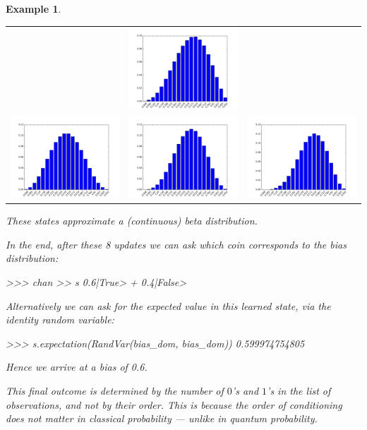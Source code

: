 \documentclass[leqno]{tufte-book} %
\newtheorem{example}[theorem]{Example}
\begin{document}
\begin{example}
\begin{center}
\begin{tabular}{ccc}
&
\includegraphics[width=15em]{Pictures/disc_coin_parameter-5.png}
\\
\includegraphics[width=15em]{Pictures/disc_coin_parameter-6.png} 
&
\includegraphics[width=15em]{Pictures/disc_coin_parameter-7.png}
&
\includegraphics[width=15em]{Pictures/disc_coin_parameter-8.png}
\end{tabular}
\end{center}

\noindent These states approximate a (continuous) beta distribution.

In the end, after these 8 updates we can ask which coin corresponds to
the bias distribution:
\begin{python}
>>> chan >> s
0.6|True> + 0.4|False>
\end{python}

\noindent Alternatively we can ask for the expected value in
this learned state, via the identity random variable:
\begin{python}
>>> s.expectation(RandVar(bias_dom, bias_dom))
0.599974754805
\end{python}

\noindent Hence we arrive at a bias of 0.6. 

This final outcome is determined by the number of $0$'s and $1$'s in
the list of observations, and not by their order. This is because the
order of conditioning does not matter in classical probability ---
unlike in quantum probability.
\end{example}
\end{document}

